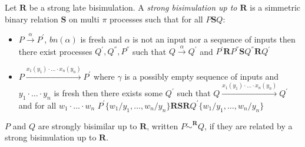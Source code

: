 \begin{definition}\label{strongLateBisimulationUpTo}
  Let $\mathbf{R}$ be a strong late bisimulation. A \emph{strong bisimulation up to $\mathbf{R}$} is a simmetric binary relation $\mathbf{S}$ on multi $\pi$ processes such that for all $P\mathbf{S}Q$:
   \begin{itemize}
     \item 
       $P \xrightarrow{\alpha} P^{'}$, $bn(\alpha)$ is fresh and $\alpha$ is not an input nor a sequence of inputs then there exist processes $Q^{'}, Q^{''}, P^{''}$ such that $Q \xrightarrow{\alpha} Q^{'}$ and $P^{'} \mathbf{R} P^{''} \mathbf{S} Q^{''} \mathbf{R} Q^{'}$
     \item
       $P \xrightarrow{x_{1}(y_{1}) \cdot \ldots \cdot x_{n}(y_{n})} P^{'}$ where $\gamma$ is a possibly empty sequence of inputs and $y_{1} \cdot \ldots \cdot y_{n}$ is fresh then there exists some $Q^{'}$ such that $Q \xrightarrow{x_{1}(y_{1}) \cdot \ldots \cdot x_{n}(y_{n})} Q^{'}$ and for all $w_{1}\cdot \ldots \cdot w_{n}$  $P^{'}\{w_{1}/y_{1}, \ldots, w_{n}/y_{n}\} \mathbf{R} \mathbf{S} \mathbf{R} Q^{'}\{w_{1}/y_{1}, \ldots, w_{n}/y_{n}\}$
  \end{itemize}
  $P$ and $Q$ are strongly bisimilar up to $\mathbf{R}$, written $P \dot{\sim}^{\mathbf{R}} Q$, if they are related by a strong bisimulation up to $\mathbf{R}$.
\end{definition}


